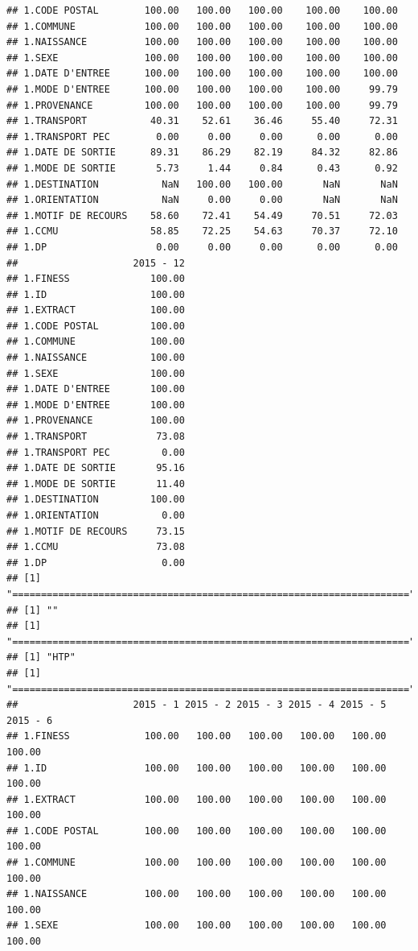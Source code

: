 \documentclass[]{article}
\begin{document}
\begin{verbatim}
## 1.CODE POSTAL        100.00   100.00   100.00    100.00    100.00
## 1.COMMUNE            100.00   100.00   100.00    100.00    100.00
## 1.NAISSANCE          100.00   100.00   100.00    100.00    100.00
## 1.SEXE               100.00   100.00   100.00    100.00    100.00
## 1.DATE D'ENTREE      100.00   100.00   100.00    100.00    100.00
## 1.MODE D'ENTREE      100.00   100.00   100.00    100.00     99.79
## 1.PROVENANCE         100.00   100.00   100.00    100.00     99.79
## 1.TRANSPORT           40.31    52.61    36.46     55.40     72.31
## 1.TRANSPORT PEC        0.00     0.00     0.00      0.00      0.00
## 1.DATE DE SORTIE      89.31    86.29    82.19     84.32     82.86
## 1.MODE DE SORTIE       5.73     1.44     0.84      0.43      0.92
## 1.DESTINATION           NaN   100.00   100.00       NaN       NaN
## 1.ORIENTATION           NaN     0.00     0.00       NaN       NaN
## 1.MOTIF DE RECOURS    58.60    72.41    54.49     70.51     72.03
## 1.CCMU                58.85    72.25    54.63     70.37     72.10
## 1.DP                   0.00     0.00     0.00      0.00      0.00
##                    2015 - 12
## 1.FINESS              100.00
## 1.ID                  100.00
## 1.EXTRACT             100.00
## 1.CODE POSTAL         100.00
## 1.COMMUNE             100.00
## 1.NAISSANCE           100.00
## 1.SEXE                100.00
## 1.DATE D'ENTREE       100.00
## 1.MODE D'ENTREE       100.00
## 1.PROVENANCE          100.00
## 1.TRANSPORT            73.08
## 1.TRANSPORT PEC         0.00
## 1.DATE DE SORTIE       95.16
## 1.MODE DE SORTIE       11.40
## 1.DESTINATION         100.00
## 1.ORIENTATION           0.00
## 1.MOTIF DE RECOURS     73.15
## 1.CCMU                 73.08
## 1.DP                    0.00
## [1] "====================================================================="
## [1] ""
## [1] "====================================================================="
## [1] "HTP"
## [1] "====================================================================="
##                    2015 - 1 2015 - 2 2015 - 3 2015 - 4 2015 - 5 2015 - 6
## 1.FINESS             100.00   100.00   100.00   100.00   100.00   100.00
## 1.ID                 100.00   100.00   100.00   100.00   100.00   100.00
## 1.EXTRACT            100.00   100.00   100.00   100.00   100.00   100.00
## 1.CODE POSTAL        100.00   100.00   100.00   100.00   100.00   100.00
## 1.COMMUNE            100.00   100.00   100.00   100.00   100.00   100.00
## 1.NAISSANCE          100.00   100.00   100.00   100.00   100.00   100.00
## 1.SEXE               100.00   100.00   100.00   100.00   100.00   100.00

\end{verbatim}
\end{document}

